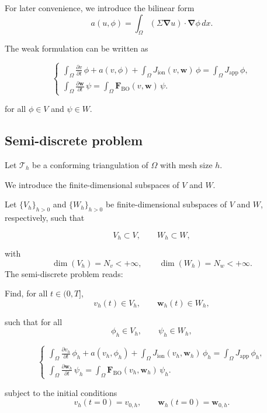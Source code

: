 \documentclass{Configuration_Files/PoliMi3i_thesis}
\begin{document}
For later convenience, we introduce the bilinear form
\begin{equation}
a(u,\phi)
=
\int_\Omega
(\Sigma\boldsymbol{\nabla} u)\cdot\boldsymbol{\nabla}\phi\,dx.
\end{equation}

The weak formulation can be written as

\begin{equation}
\left\{
\begin{array}{l}
\int_\Omega \frac{\partial v}{\partial t}\,\phi
+
a(v,\phi)
+
\int_\Omega J_{\mathrm{ion}}(v,\mathbf{w})\,\phi
=
\int_\Omega J_{\mathrm{app}}\,\phi,
\\[0.8em]
\int_\Omega \frac{\partial \mathbf{w}}{\partial t}\,\psi
=
\int_\Omega \mathbf{F}_{\mathrm{BO}}(v,\mathbf{w})\,\psi.
\end{array}
\right.
\end{equation}

for all $\phi\in V$ and $\psi\in W$.

\subsection{Semi-discrete problem}

Let $\mathcal T_h$ be a conforming triangulation of $\Omega$ with mesh size $h$.

We introduce the finite-dimensional subspaces of $V$ and $W$.

Let $\{V_h\}_{h>0}$ and $\{W_h\}_{h>0}$ be finite-dimensional subspaces of
$V$ and $W$, respectively, such that

\[
V_h \subset V, \qquad W_h \subset W,
\]

with
\[
\dim(V_h)=N_v<+\infty, \qquad \dim(W_h)=N_w<+\infty.
\]
The semi-discrete problem reads:
\begin{tcolorbox}[title=Semi-Discrete Formulation,colback=white,colframe=black]

Find, for all $t \in (0,T]$, 
\[
v_h(t)\in V_h,
\qquad
\mathbf w_h(t)\in W_h,
\]

such that for all
\[
\phi_h\in V_h,
\qquad
\psi_h\in W_h,
\]

\[
\left\{
\begin{array}{l}
\displaystyle
\int_\Omega \frac{\partial v_h}{\partial t}\,\phi_h
+
a(v_h,\phi_h)
+
\int_\Omega J_{\mathrm{ion}}(v_h,\mathbf w_h)\,\phi_h
=
\int_\Omega J_{\mathrm{app}}\,\phi_h,
\\[0.8em]

\displaystyle
\int_\Omega \frac{\partial \mathbf w_h}{\partial t}\,\psi_h
=
\int_\Omega \mathbf F_{\mathrm{BO}}(v_h,\mathbf w_h)\,\psi_h.
\end{array}
\right.
\]

subject to the initial conditions
\[
v_h(t=0)=v_{0,h},
\qquad
\mathbf w_h(t=0)=\mathbf w_{0,h}.
\]

\end{tcolorbox}
\end{document}
